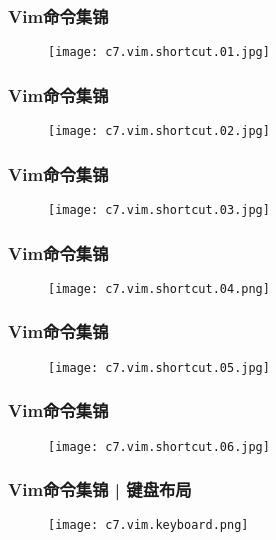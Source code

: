 \begin{frame}
  \frametitle{Vim命令集锦}
  \begin{figure}
    \centering
    \texttt{[image: c7.vim.shortcut.01.jpg]}
  \end{figure}
\end{frame}

\begin{frame}
  \frametitle{Vim命令集锦}
  \begin{figure}
    \centering
    \texttt{[image: c7.vim.shortcut.02.jpg]}
  \end{figure}
\end{frame}

\begin{frame}
  \frametitle{Vim命令集锦}
  \begin{figure}
    \centering
    \texttt{[image: c7.vim.shortcut.03.jpg]}
  \end{figure}
\end{frame}

\begin{frame}
  \frametitle{Vim命令集锦}
  \begin{figure}
    \centering
    \texttt{[image: c7.vim.shortcut.04.png]}
  \end{figure}
\end{frame}

\begin{frame}
  \frametitle{Vim命令集锦}
  \begin{figure}
    \centering
    \texttt{[image: c7.vim.shortcut.05.jpg]}
  \end{figure}
\end{frame}

\begin{frame}
  \frametitle{Vim命令集锦}
  \begin{figure}
    \centering
    \texttt{[image: c7.vim.shortcut.06.jpg]}
  \end{figure}
\end{frame}

\begin{frame}
  \frametitle{Vim命令集锦 | 键盘布局}
  \begin{figure}
    \centering
    \texttt{[image: c7.vim.keyboard.png]}
  \end{figure}
\end{frame}

